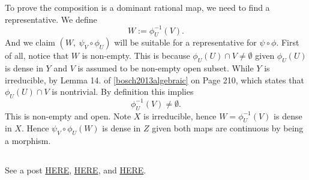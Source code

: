 To prove the composition is a dominant rational map, we need to find a representative. 
We define 
\[W:=\phi_U^{-1}(V).\] 
And we claim $(W,~\psi_V\circ\phi_U)$ will be suitable for a representative for $\psi\circ\phi$.
First of all, notice that $W$ is non-empty. This is because $\phi_U(U)\cap V\neq \emptyset$ given $\phi_U(U)$ is dense in $Y$ and $V$ is assumed to be non-empty open subset. While $Y$ is irreducible, by Lemma 14. of \ref{bosch2013algebraic} on Page 210, which states that $\phi_U(U)\cap V$ is nontrivial. By definition this implies 
\[\phi_U^{-1}(V)\neq \emptyset.\] This is non-empty and open. Note $X$ is irreducible, hence $W=\phi_U^{-1}(V)$ is dense in $X$. Hence $\psi_V\circ\phi_U (W)$ is dense in $Z$ given both maps are continuous by being a morphism.

\subsection{}

See a post \href{https://math.stackexchange.com/questions/1191794/composition-of-dominant-rational-maps}{HERE}, \href{https://people.maths.bris.ac.uk/~malab/PDFs/Algebraic%20Geometry%20L3.pdf}{HERE}, and \href{https://math.stackexchange.com/questions/431578/questions-about-the-composition-of-two-dominant-rational-maps}{HERE}.